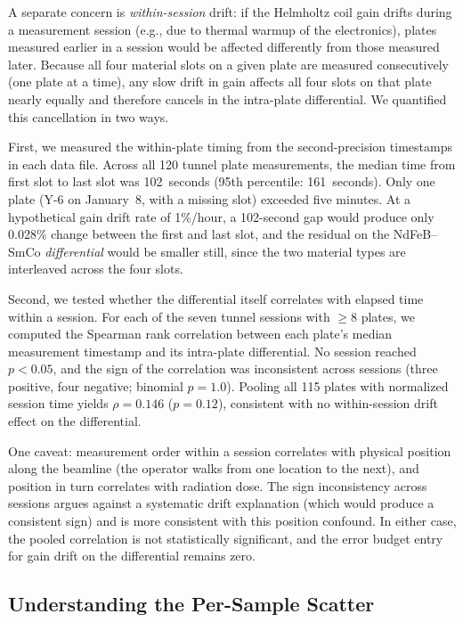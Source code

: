 \documentclass[11pt,letterpaper]{article}
\begin{document}
A separate concern is \emph{within-session} drift: if the Helmholtz coil gain
drifts during a measurement session (e.g., due to thermal warmup of the
electronics), plates measured earlier in a session would be affected differently
from those measured later. Because all four material slots on a given plate are
measured consecutively (one plate at a time), any slow drift in gain affects all
four slots on that plate nearly equally and therefore cancels in the intra-plate
differential. We quantified this cancellation in two ways.

First, we measured the within-plate timing from the second-precision timestamps
in each data file. Across all 120 tunnel plate measurements, the median time
from first slot to last slot was 102~seconds (95th percentile: 161~seconds).
Only one plate (Y-6 on January~8, with a missing slot) exceeded five minutes.
At a hypothetical gain drift rate of 1\%/hour, a 102-second gap would produce
only 0.028\% change between the first and last slot, and the residual on the
NdFeB--SmCo \emph{differential} would be smaller still, since the two material
types are interleaved across the four slots.

Second, we tested whether the differential itself correlates with elapsed time
within a session. For each of the seven tunnel sessions with $\geq$8 plates, we
computed the Spearman rank correlation between each plate's median measurement
timestamp and its intra-plate differential. No session reached $p < 0.05$, and
the sign of the correlation was inconsistent across sessions (three positive,
four negative; binomial $p = 1.0$). Pooling all 115 plates with normalized
session time yields $\rho = 0.146$ ($p = 0.12$), consistent with no
within-session drift effect on the differential.

One caveat: measurement order within a session correlates with physical
position along the beamline (the operator walks from one location to the next),
and position in turn correlates with radiation dose. The sign inconsistency
across sessions argues against a systematic drift explanation (which would
produce a consistent sign) and is more consistent with this position confound.
In either case, the pooled correlation is not statistically significant, and the
error budget entry for gain drift on the differential remains zero.

\subsection{Understanding the Per-Sample Scatter}
\label{sec:smco_scatter}
\end{document}
